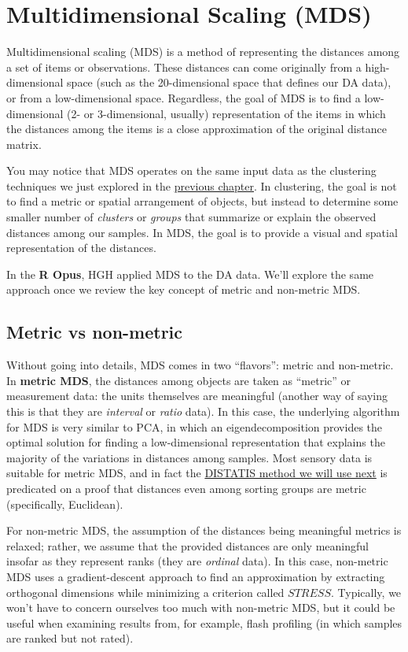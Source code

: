 \documentclass[
]{book}
\begin{document}
\chapter{Multidimensional Scaling (MDS)}\label{multidimensional-scaling-mds}

Multidimensional scaling (MDS) is a method of representing the distances among a set of items or observations. These distances can come originally from a high-dimensional space (such as the 20-dimensional space that defines our DA data), or from a low-dimensional space. Regardless, the goal of MDS is to find a low-dimensional (2- or 3-dimensional, usually) representation of the items in which the distances among the items is a close approximation of the original distance matrix.

You may notice that MDS operates on the same input data as the clustering techniques we just explored in the \hyperref[cluster-analysis]{previous chapter}. In clustering, the goal is not to find a metric or spatial arrangement of objects, but instead to determine some smaller number of \emph{clusters} or \emph{groups} that summarize or explain the observed distances among our samples. In MDS, the goal is to provide a visual and spatial representation of the distances.

In the \textbf{R Opus}, HGH applied MDS to the DA data. We'll explore the same approach once we review the key concept of metric and non-metric MDS.

\section{Metric vs non-metric}\label{metric-vs-non-metric}

Without going into details, MDS comes in two ``flavors'': metric and non-metric. In \textbf{metric MDS}, the distances among objects are taken as ``metric'' or measurement data: the units themselves are meaningful (another way of saying this is that they are \emph{interval} or \emph{ratio} data). In this case, the underlying algorithm for MDS is very similar to PCA, in which an eigendecomposition provides the optimal solution for finding a low-dimensional representation that explains the majority of the variations in distances among samples. Most sensory data is suitable for metric MDS, and in fact the \hyperref[distatis]{DISTATIS method we will use next} is predicated on a proof that distances even among sorting groups are metric (specifically, Euclidean).

For non-metric MDS, the assumption of the distances being meaningful metrics is relaxed; rather, we assume that the provided distances are only meaningful insofar as they represent ranks (they are \emph{ordinal} data). In this case, non-metric MDS uses a gradient-descent approach to find an approximation by extracting orthogonal dimensions while minimizing a criterion called \(STRESS\). Typically, we won't have to concern ourselves too much with non-metric MDS, but it could be useful when examining results from, for example, flash profiling (in which samples are ranked but not rated).
\end{document}
